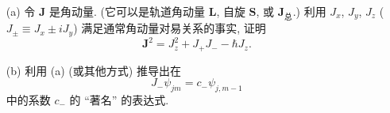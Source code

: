 \documentclass{assignment}
\begin{document}
\begin{prob}[课本习题 3.15]
    \begin{itemize}
        \item[(a)] 令 $\bm{J}$ 是角动量. (它可以是轨道角动量 $\bm{L}$, 自旋 $\bm{S}$, 或 $\bm{J}_{\text{总}}$.) 利用 $J_x$, $J_y$, $J_z$ ($J_{\pm}\equiv J_x\pm iJ_y$) 满足通常角动量对易关系的事实, 证明
        \[
            \bm{J}^2=J_z^2+J_+J_--\hbar J_z.
        \]
        \item[(b)] 利用 (a) (或其他方式) 推导出在
        \[
            J_-\psi_{jm}=c_-\psi_{j,m-1}
        \]
        中的系数 $c_-$ 的 ``著名'' 的表达式.
    \end{itemize}
\end{prob}
\begin{pf}
    
\end{pf}
\end{document}

